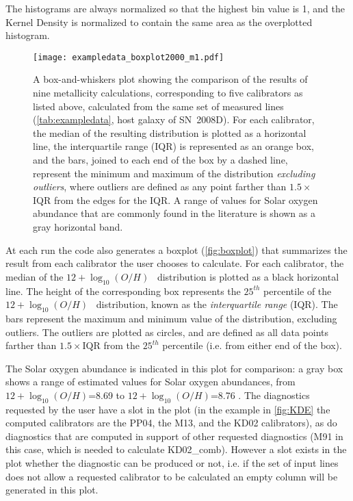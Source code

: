 \documentclass{emulateapj}
\newcommand{\oxabinline}{\ensuremath{12 + \log_{10}(O/H)}}
\begin{document}
The histograms are always normalized so that the highest bin value is
1, and the Kernel Density is normalized to contain the same area as the
overplotted histogram.


\begin{figure}[ht!]
  \texttt{[image: exampledata\_boxplot2000\_m1.pdf]}
   \caption{A box-and-whiskers plot showing the comparison of the
     results of nine metallicity calculations, corresponding to five
     calibrators as listed above, calculated from the same set of
     measured lines (\autoref{tab:exampledata}, host galaxy of
     SN~2008D). For each calibrator, the median of the resulting
     distribution is plotted as a horizontal line, the interquartile
     range (IQR) is represented as an orange box, and the bars, joined
     to each end of the box by a dashed line, represent the minimum
     and maximum of the distribution \emph{excluding outliers}, where
     outliers are defined as any point farther than $1.5\times$ IQR
     from the edges for the IQR. A range of values for Solar oxygen
     abundance that are commonly found in the literature is shown as
     a gray horizontal band.}
 \label{fig:boxplot}
\end{figure}

At each run the code also generates a boxplot (\autoref{fig:boxplot})
that summarizes the result from each calibrator the user chooses to
calculate. For each calibrator, the median of the \oxabinline~
distribution is plotted as a black horizontal line. The height of the
corresponding box represents the $25^{th}$ percentile of the
\oxabinline~ distribution, known as the \emph{interquartile range}
(IQR).  The bars represent the maximum and minimum value of the
distribution, excluding outliers. The outliers are plotted as circles,
and are defined as all data points farther than
$1.5\times\mathrm{IQR}$ from the $25^{th}$ percentile (i.e. from
either end of the box).

The Solar oxygen abundance is indicated in this plot for comparison: a
gray box shows a range of estimated values for Solar oxygen
abundances, from \oxabinline=8.69 \citep{asplund09_rev} to
\oxabinline=8.76 \citep{chaffau11}.  The diagnostics requested by the
user have a slot in the plot (in the example in \autoref{fig:KDE}
the computed calibrators are the PP04, the M13, and the KD02
calibrators), as do diagnostics that are computed in support of other
requested diagnostics (M91 in this case, which is needed to calculate
KD02\_comb). However a slot exists in the plot whether the diagnostic
can be produced or not, i.e. if the set of input lines does not allow
a requested calibrator to be calculated an empty column will be
generated in this plot.
\end{document}
